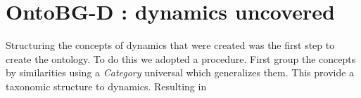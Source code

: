 \section{OntoBG-D : dynamics uncovered}

Structuring the concepts of dynamics that were created was the first step to create the ontology. To do this we adopted a procedure. First group the concepts by similarities using a \textit{Category} universal which generalizes them. This provide a taxonomic structure to dynamics. Resulting in 

